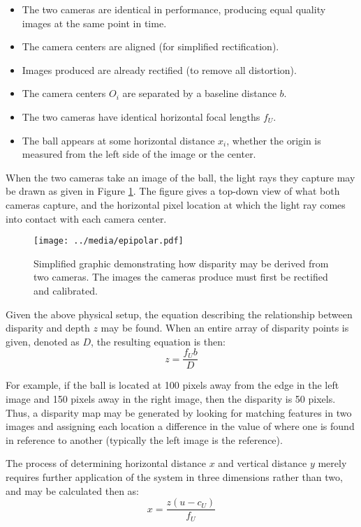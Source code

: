 \begin{itemize} \itemsep=-0.5em
	\item The two cameras are identical in performance, producing equal quality images at the same point in time.
	\item The camera centers are aligned (for simplified rectification).
	\item Images produced are already rectified (to remove all distortion).
	\item The camera centers $O_i$ are separated by a baseline distance $b$.
	\item The two cameras have identical horizontal focal lengths $f_U$.
	\item The ball appears at some horizontal distance $x_i$, whether the origin is measured from the left side of the image or the center.
\end{itemize}

When the two cameras take an image of the ball, the light rays they capture may be drawn as given in Figure \ref{epipolar}. The figure gives a top-down view of what both cameras capture, and the horizontal pixel location at which the light ray comes into contact with each camera center. 

\begin{figure}[ht]
    \centering
	\texttt{[image: ../media/epipolar.pdf]}
	\caption{Simplified graphic demonstrating how disparity may be derived from two cameras. The images the cameras produce must first be rectified and calibrated.}
	\label{epipolar}
\end{figure}

Given the above physical setup, the equation describing the relationship between disparity and depth $z$ may be found. When an entire array of disparity points is given, denoted as $D$, the resulting equation is then: 
\begin{equation}
z = \frac{f_U b}{D}
\label{eq_epi_z}
\end{equation}

For example, if the ball is located at 100 pixels away from the edge in the left image and 150 pixels away in the right image, then the disparity is 50 pixels. Thus, a disparity map may be generated by looking for matching features in two images and assigning each location a difference in the value of where one is found in reference to another (typically the left image is the reference).

The process of determining horizontal distance $x$ and vertical distance $y$ merely requires further application of the system in three dimensions rather than two, and may be calculated then as: 
\begin{equation}
x = \frac{z (u - c_U)}{f_U}
\end{equation}

